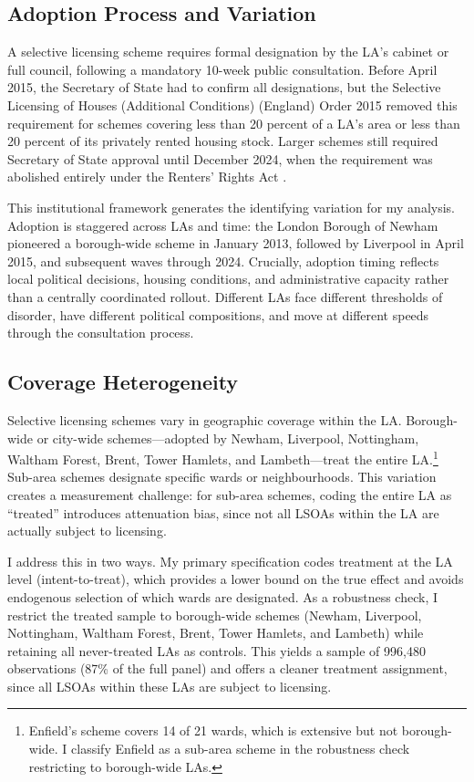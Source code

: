 \documentclass[12pt]{article}
\begin{document}
\subsection{Adoption Process and Variation}

A selective licensing scheme requires formal designation by the LA's cabinet or full council, following a mandatory 10-week public consultation. Before April 2015, the Secretary of State had to confirm all designations, but the Selective Licensing of Houses (Additional Conditions) (England) Order 2015 removed this requirement for schemes covering less than 20 percent of a LA's area or less than 20 percent of its privately rented housing stock. Larger schemes still required Secretary of State approval until December 2024, when the requirement was abolished entirely under the Renters' Rights Act \citep{mhclg2024}.

This institutional framework generates the identifying variation for my analysis. Adoption is staggered across LAs and time: the London Borough of Newham pioneered a borough-wide scheme in January 2013, followed by Liverpool in April 2015, and subsequent waves through 2024. Crucially, adoption timing reflects local political decisions, housing conditions, and administrative capacity rather than a centrally coordinated rollout. Different LAs face different thresholds of disorder, have different political compositions, and move at different speeds through the consultation process.

\subsection{Coverage Heterogeneity}

Selective licensing schemes vary in geographic coverage within the LA. Borough-wide or city-wide schemes---adopted by Newham, Liverpool, Nottingham, Waltham Forest, Brent, Tower Hamlets, and Lambeth---treat the entire LA.\footnote{Enfield's scheme covers 14 of 21 wards, which is extensive but not borough-wide. I classify Enfield as a sub-area scheme in the robustness check restricting to borough-wide LAs.} Sub-area schemes designate specific wards or neighbourhoods. This variation creates a measurement challenge: for sub-area schemes, coding the entire LA as ``treated'' introduces attenuation bias, since not all LSOAs within the LA are actually subject to licensing.

I address this in two ways. My primary specification codes treatment at the LA level (intent-to-treat), which provides a lower bound on the true effect and avoids endogenous selection of which wards are designated. As a robustness check, I restrict the treated sample to borough-wide schemes (Newham, Liverpool, Nottingham, Waltham Forest, Brent, Tower Hamlets, and Lambeth) while retaining all never-treated LAs as controls. This yields a sample of 996{,}480 observations (87\% of the full panel) and offers a cleaner treatment assignment, since all LSOAs within these LAs are subject to licensing.
\end{document}
